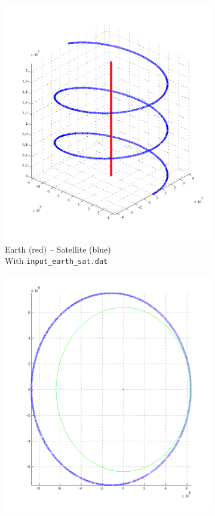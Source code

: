\documentclass{article}
\begin{document}
\begin{figure}[H]
        \begin{subfigure}[b]{0.3\textwidth}
                \centering
                \includegraphics[width=\textwidth]{img/earth_sat}
                \caption{Earth (red) -- Satellite (blue)\\With \texttt{input\_earth\_sat.dat}}
                \label{fig:satgeo}
        \end{subfigure}
        \begin{subfigure}[b]{0.3\textwidth}
                \centering
                \includegraphics[width=\textwidth]{img/nc}

\end{subfigure}
\end{figure}
\end{document}
